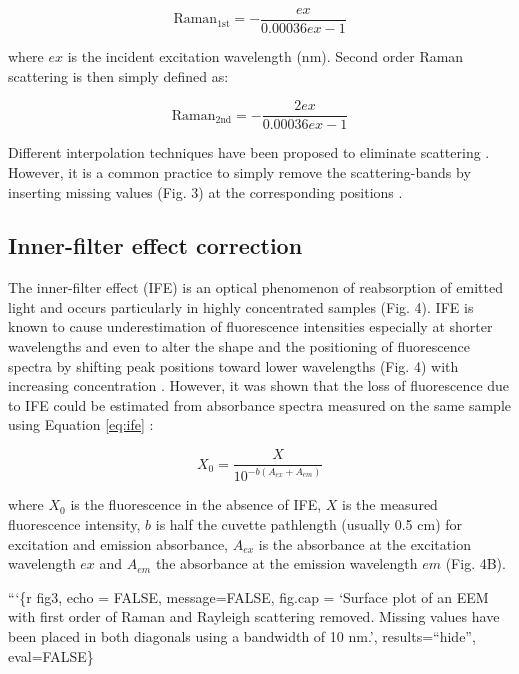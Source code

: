 \documentclass[]{book}
\theoremstyle{definition}
\theoremstyle{definition}
\theoremstyle{remark}
\begin{document}
\begin{equation}
\text{Raman}_{\text{1st}} = -\frac{ex}{0.00036 ex - 1}
\label{eq:raman1}
\end{equation}

where \(ex\) is the incident excitation wavelength (nm). Second order
Raman scattering is then simply defined as:

\begin{equation}
\text{Raman}_{\text{2nd}} = -\frac{2ex}{0.00036 ex - 1}
\label{eq:raman2}
\end{equation}

Different interpolation techniques have been proposed to eliminate
scattering \citep{Zepp2004, Bahram2006}. However, it is a common
practice to simply remove the scattering-bands by inserting missing
values (Fig. 3) at the corresponding positions
\citep{Murphy2013, Stedmon2008}.

\subsection{Inner-filter effect
correction}\label{inner-filter-effect-correction}

The inner-filter effect (IFE) is an optical phenomenon of reabsorption
of emitted light and occurs particularly in highly concentrated samples
(Fig. 4). IFE is known to cause underestimation of fluorescence
intensities especially at shorter wavelengths and even to alter the
shape and the positioning of fluorescence spectra by shifting peak
positions toward lower wavelengths (Fig. 4) with increasing
concentration \citep{Mobed1996, Kothawala2013}. However, it was shown
that the loss of fluorescence due to IFE could be estimated from
absorbance spectra measured on the same sample using Equation
\eqref{eq:ife} \citep{Ohno2002, Parker1957}:

\begin{equation}
X_0 = \frac{X}{10^{-b(A_{ex} + A_{em})}}
\label{eq:ife}
\end{equation}

where \(X_0\) is the fluorescence in the absence of IFE, \(X\) is the
measured fluorescence intensity, \(b\) is half the cuvette pathlength
(usually 0.5 cm) for excitation and emission absorbance, \(A_{ex}\) is
the absorbance at the excitation wavelength \(ex\) and \(A_{em}\) the
absorbance at the emission wavelength \(em\) (Fig. 4B).

```\{r fig3, echo = FALSE, message=FALSE, fig.cap = `Surface plot of an
EEM with first order of Raman and Rayleigh scattering removed. Missing
values have been placed in both diagonals using a bandwidth of 10 nm.',
results=``hide'', eval=FALSE\}
\end{document}

